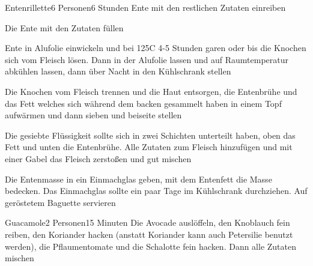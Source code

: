 
\begin{recipe}{Entenrillette}{6 Personen}{6 Stunden}
Ente mit den restlichen Zutaten einreiben

Die Ente mit den Zutaten füllen
 
\ing[]{}{}
Ente in Alufolie einwickeln und bei 125\0C 4-5 Stunden garen oder bis die Knochen sich vom Fleisch lösen.
Dann in der Alufolie lassen und auf Raumtemperatur abkühlen lassen, dann über Nacht in den Kühlschrank stellen

\ing[]{}{}
Die Knochen vom Fleisch trennen und die Haut entsorgen, die Entenbrühe und das Fett welches sich während dem backen gesammelt haben in einem Topf aufwärmen und dann sieben und beiseite stellen

Die gesiebte Flüssigkeit sollte sich in zwei Schichten unterteilt haben, oben das Fett und unten die Entenbrühe.
Alle Zutaten zum Fleisch hinzufügen und mit einer Gabel das Fleisch zerstoßen und gut mischen

Die Entenmasse in ein Einmachglas geben, mit dem Entenfett die Masse bedecken.
Das Einmachglas sollte ein paar Tage im Kühlschrank durchziehen.
Auf geröstetem Baguette servieren
\end{recipe}


\begin{recipe}{Guacamole}{2 Personen}{15 Minuten}
Die Avocade auslöffeln, den Knoblauch fein reiben, den Koriander hacken (anstatt Koriander kann auch Petersilie benutzt werden), die Pflaumentomate und die Schalotte fein hacken. Dann alle Zutaten mischen 
\end{recipe}


